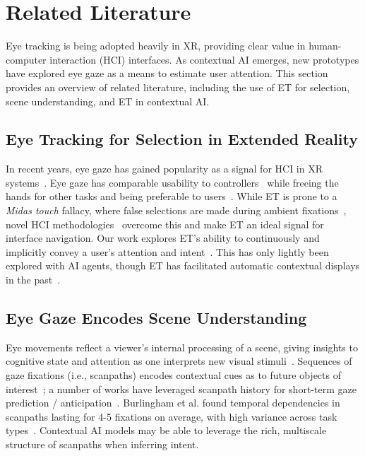 \section{Related Literature}

Eye tracking is being adopted heavily in XR, providing clear value in human-computer interaction (HCI) interfaces.  As contextual AI emerges, new prototypes have explored eye gaze as a means to estimate user attention.  This section provides an overview of related literature, including the use of ET for selection, scene understanding, and ET in contextual AI.

\subsection{Eye Tracking for Selection in Extended Reality}

In recent years, eye gaze has gained popularity as a signal for HCI in XR systems~\cite{plopski_survey_2022}.  Eye gaze has comparable usability to controllers~\cite{luro_comparative_2019, zhang_telepresence_2019,fernandes2024effect} while freeing the hands for other tasks and being preferable to users~\cite{piening_looking_2021}.  While ET is prone to a \textit{Midas touch} fallacy, where false selections are made during ambient fixations~\cite{jacob_advanced_1995}, novel HCI methodologies~\cite{khamis_vrpursuits_2018} overcome this and make ET an ideal signal for interface navigation. Our work explores ET's ability to continuously and implicitly convey a user's attention and intent~\cite{sendhilnathan2024implicitgazeresearchxr}.  This has only lightly been explored with AI agents, though ET has facilitated automatic contextual displays in the past~\cite{toyama_recognition_2012}.

\subsection{Eye Gaze Encodes Scene Understanding}

Eye movements reflect a viewer's internal processing of a scene, giving insights to cognitive state and attention as one interprets new visual stimuli~\cite{langton_eyes_2000, eckstein_beyond_2017}. Sequences of gaze fixations (i.e., scanpaths) encodes contextual cues as to future objects of interest~\cite{itti_computational_2001, burlingham_laziness_2024}; a number of works have leveraged scanpath history for short-term gaze prediction / anticipation~\cite{huang_predicting_2018, david-john_prediction_2021, Hu2021, damelio_tppgaze_2024}. Burlingham et al. found temporal dependencies in scanpaths lasting for 4-5 fixations on average, with high variance across task types~\cite{burlingham_scanpaths_2024}. Contextual AI models may be able to leverage the rich, multiscale structure of scanpaths when inferring intent. %

